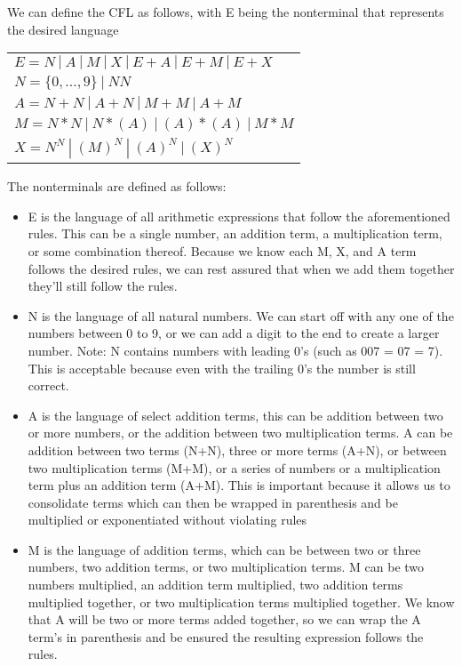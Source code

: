 \documentclass[11pt, letterpaper]{article}
\begin{document}
\begin{enumerate}[label=\Alph*]
We can define the CFL as follows, with E being the nonterminal that represents the desired language

\begin{center}
\begin{tabular}{l}

$E = N\ |\ A\ |\ M\ |\ X\ |\ E + A\ |\ E+M\ |\ E+X $ \\
$N = \{0,...,9\}\ |\ NN $ \\
$A = N + N\ |\ A + N\ |\ M+M\ |\ A+M $ \\
$M = N*N\ |\ N*(A)\ |\ (A)*(A)\ |\ M*M $ \\
$X = N^N\ |\ (M)^N\ |\ (A)^N\ |\ (X)^N $ \\

\end{tabular}
\end{center}

\quad The nonterminals are defined as follows:

\begin{itemize}

\item E is the language of all arithmetic expressions that follow the aforementioned rules. This can be a single number, an addition term, a multiplication term, or some combination thereof. Because we know each M, X, and A term follows the desired rules, we can rest assured that when we add them together they'll still follow the rules.

\item N is the language of all natural numbers. We can start off with any one of the numbers between 0 to 9, or we can add a digit to the end to create a larger number. Note: N contains numbers with leading 0's (such as 007 = 07 = 7). This is acceptable because even with the trailing 0's the number is still correct.

\item A is the language of select addition terms, this can be addition between two or more numbers, or the addition between two multiplication terms. A can be addition between two terms (N+N), three or more terms (A+N), or between two multiplication terms (M+M), or a series of numbers or a multiplication term plus an addition term (A+M). This is important because it allows us to consolidate terms which can then be wrapped in parenthesis and be multiplied or exponentiated without violating rules

\item M is the language of addition terms, which can be between two or three numbers, two addition terms, or two multiplication terms. M can be two numbers multiplied, an addition term multiplied, two addition terms multiplied together, or two multiplication terms multiplied together. We know that A will be two or more terms added together, so we can wrap the A term's in parenthesis and be ensured the resulting expression follows the rules.


\end{itemize}
\end{enumerate}
\end{document}
